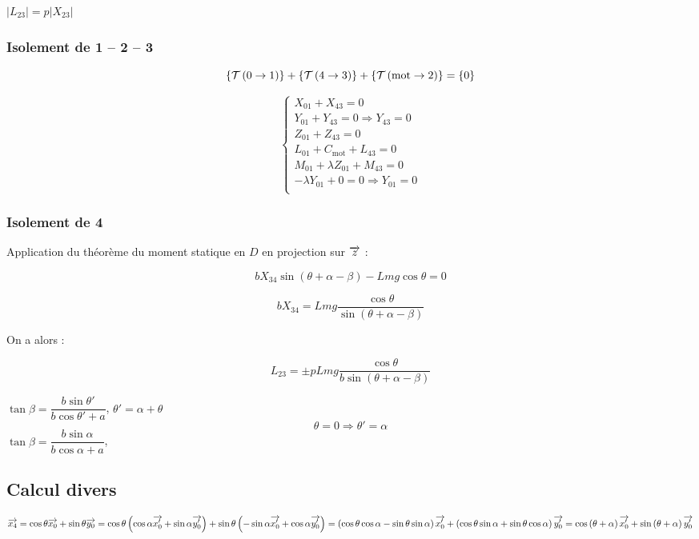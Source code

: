 \documentclass[10pt,fleqn]{article} %
\begin{document}
$|L_{23}|=p|X_{23}|$


\subsubsection*{Isolement de 1 -- 2 -- 3}

$$
\left\{\mathcal{T} \left(0\rightarrow 1 \right) \right\}+\left\{\mathcal{T} \left(4\rightarrow 3 \right) \right\}+\left\{\mathcal{T} \left(\text{mot}\rightarrow 2 \right) \right\} = \{0\}
$$


$$
\left\{
\begin{array}{l}
X_{01} +  X_{43}= 0\\
Y_{01} + Y_{43} = 0 \Rightarrow  Y_{43} = 0  \\
Z_{01} + Z_{43} = 0\\
L_{01} + C_{\text{mot}} + L_{43} = 0\\
M_{01}+\lambda Z_{01} + M_{43} = 0\\
-\lambda Y_{01}  + 0= 0 \Rightarrow Y_{01} = 0\\
\end{array}
\right.
$$


\subsubsection*{Isolement de 4}

Application du théorème du moment statique en $D$ en projection sur $\overrightarrow{z}$ :

$$ b  X_{34} \sin \left(\theta + \alpha -\beta\right)    -Lmg \cos \theta = 0
$$

$$ b  X_{34}   = Lmg \dfrac{\cos \theta}{\sin \left(\theta + \alpha -\beta\right)} 
$$

On a alors :

$$   L_{23}   = \pm p Lmg \dfrac{\cos \theta}{b \sin \left(\theta + \alpha -\beta\right)} 
$$

$\tan\beta = \dfrac{ b \sin \theta' }{b \cos\theta' + a}$, 
$\theta' = \alpha + \theta$
$$\theta=0 \Rightarrow \theta' = \alpha $$
 $\tan\beta = \dfrac{ b \sin \alpha}{b \cos\alpha + a}$, 
\subsection{Calcul divers}

$\overrightarrow{x_4}  
= \cos \theta \overrightarrow{x_0} + \sin \theta \overrightarrow{y_0} 
= \cos \theta \left( \cos \alpha \overrightarrow{x_0'} + \sin \alpha \overrightarrow{y_0'} \right) + \sin \theta \left(
-\sin \alpha \overrightarrow{x_0'} + \cos \alpha \overrightarrow{y_0'} 
 \right)
 = \left(\cos \theta \cos \alpha -\sin \theta \sin \alpha \right)\overrightarrow{x_0'} + \left(\cos \theta \sin \alpha  + \sin \theta \cos \alpha \right)\overrightarrow{y_0'} 
  = \cos \left(\theta + \alpha \right)\overrightarrow{x_0'} + \sin \left(\theta + \alpha \right)\overrightarrow{y_0'} 
$
\end{document}
